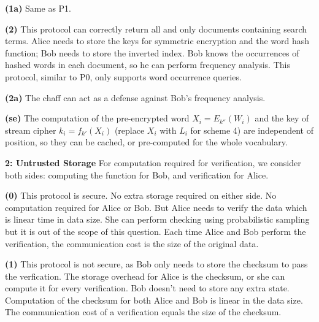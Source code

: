 \documentclass[10pt]{article}
\newcommand\question[2]{\vspace{.1in}\textbf{#1: #2}\vspace{.5em}\vspace{.10in}}
\renewcommand\part[1]{\vspace{.10in}\textbf{(#1)}}
\begin{document}
\part{1a}
Same as P1.

\part{2} 
This protocol can correctly return all and only documents containing search
terms. 
Alice needs to store the keys for symmetric encryption and the word hash
function; Bob needs to store the inverted index. 
Bob knows the occurrences of hashed words in each document, so he can perform
frequency analysis.
This protocol, similar to P0, only supports word occurrence queries.

\part{2a}
The chaff can act as a defense against Bob's frequency analysis.

\part{se}
The computation of the pre-encrypted word $X_i=E_{k''}(W_i)$ and the key of
stream cipher $k_i=f_{k'}(X_i)$ (replace $X_i$ with $L_i$ for scheme 4) are
independent of position, so they can be cached, or pre-computed for the whole
vocabulary.

\newpage
\question{2}{Untrusted Storage}
For computation required for verification, we consider both sides: computing the
function for Bob, and verification for Alice.

\part{0}
This protocol is secure.
No extra storage required on either side.
No computation required for Alice or Bob. But Alice needs to verify the data
which is linear time in data size. She can perform checking using probabilistic
sampling but it is out of the scope of this question.
Each time Alice and Bob perform the verification, the communication cost is the
size of the original data.

\part{1}
This protocol is not secure, as Bob only needs to store the checksum to pass the
verfication.
The storage overhead for Alice is the checksum, or she can compute it for every
verification. Bob doesn't need to store any extra state.
Computation of the checksum for both Alice and Bob is linear in the data size.
The communication cost of a verification equals the size of the checksum.
\end{document}
